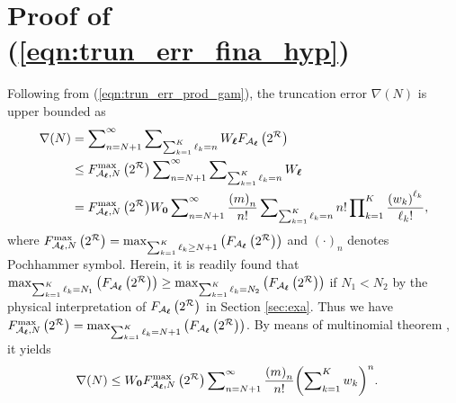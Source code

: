 \documentclass[12pt,onecolumn,draftcls]{IEEEtran}
\newcommand{\bs}{\boldsymbol}
\begin{document}
\section{Proof of (\ref{eqn:trun_err_fina_hyp})}\label{app:uperb_err}
Following from (\ref{eqn:trun_err_prod_gam}), the truncation error $\nabla(N)$ is upper bounded as
\begin{align}\label{eqn:trun_err_upp}
\nabla(N) &= \sum\nolimits_{n = N + 1}^\infty  {\sum\nolimits_{{\sum\nolimits_{k=1}^K  \ell_k = n}}  {{W_{\bs{\ell}}}{F_{{ {\cal A}_{\bs{\ell}}}}}\left( 2^{\cal R} \right)} }\notag\\
 &\le {{F_{{ {\cal A}_{\bs{\ell}}},N}^{\rm max}}\left( 2^{\cal R} \right)} \sum\nolimits_{n = N + 1}^\infty  {\sum\nolimits_{{{\sum\nolimits_{k=1}^K  \ell_k = n}}} {{W_{\bs{\ell}}}} }\notag\\
& %
 =%
 {{F_{{ {\cal A}_{\bs{\ell}}},N}^{\rm max}}\left( 2^{\cal R} \right)} {W_{\bf{0}}}\sum\nolimits_{n = N + 1}^\infty  {\frac{{{{\left( m \right)}_n}}}{{n!}}\sum\nolimits_{{\sum\nolimits_{k=1}^K  \ell_k = n}} {n!\prod\nolimits_{k = 1}^K {\frac{{{{\left( {{w_k}} \right)}^{{\ell_k}}}}}{{{\ell_k}!}}} } },
\end{align}
where ${{F_{{ {\cal A}_{\bs{\ell}}},N}^{\rm max}}\left( 2^{\cal R} \right)} = \mathop {\max }\nolimits_{\sum\nolimits_{k=1}^K  \ell_k \ge N + 1} \left( {{F_{{ {\cal A}_{\bs{\ell}}}}}\left( 2^{\cal R} \right)} \right)$ and $(\cdot)_n$ denotes Pochhammer symbol. Herein, it is readily found that $\mathop {\max }\nolimits_{\sum\nolimits_{k=1}^K  \ell_k = N_1} \left( {{F_{{ {\cal A}_{\bs{\ell}}}}}\left( 2^{\cal R} \right)} \right) \ge \mathop {\max }\nolimits_{\sum\nolimits_{k=1}^K  \ell_k = N_2} \left( {{F_{{ {\cal A}_{\bs{\ell}}}}}\left( 2^{\cal R} \right)} \right)$ if $N_1 < N_2$ by the physical interpretation of ${{F_{{ {\cal A}_{\bs{\ell}}}} \left( 2^{\cal R} \right)}}$ in Section \ref{sec:exa}. Thus we have ${{F_{{ {\cal A}_{\bs{\ell}}},N}^{\rm max}}\left( 2^{\cal R} \right)} = \mathop {\max }\nolimits_{\sum\nolimits_{k=1}^K  \ell_k = N + 1} \left( {{F_{{ {\cal A}_{\bs{\ell}}}}}\left( 2^{\cal R} \right)} \right)$. By means of multinomial theorem \cite[Eq.26.4.9]{NIST:DLMF}, it yields
\begin{align}\label{eqn:trun_erro_mul_exp}
\nabla(N)  %
 &\le {W_{\bf{0}}}{{F_{{ {\cal A}_{\bs{\ell}}},N}^{\rm max}}\left( 2^{\cal R} \right)} \sum\nolimits_{n = N + 1}^\infty  {\frac{{{{\left( m \right)}_n}}}{{n!}}{{\left( {\sum\nolimits_{k = 1}^K {{w_k}} } \right)}^n}}.
\end{align}
\end{document}
